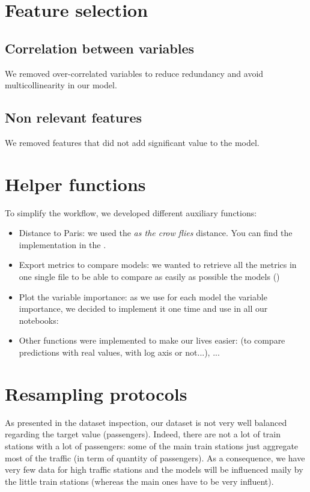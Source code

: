 \section{Feature selection}
\subsection{Correlation between variables}
We removed over-correlated variables to reduce redundancy and avoid multicollinearity in our model.

\subsection{Non relevant features}
We removed features that did not add significant value to the model.

\section{Helper functions}
To simplify the workflow, we developed different auxiliary functions:
\begin{itemize}
    \item Distance to Paris: we used the \textit{as the crow flies} distance. You can find the implementation in the \href{https://github.com/pierre-jezegou/fib-ml-project/blob/main/distance_calculation.py}{}.
    \item Export metrics to compare models: we wanted to retrieve all the metrics in one single file to be able to compare as easily as possible the models ()
    \item Plot the variable importance: as we use for each model the variable importance, we decided to implement it one time and use in all our notebooks: 
    \item Other functions were implemented to make our lives easier:  (to compare predictions with real values, with log axis or not...), ...
\end{itemize}


\section{Resampling protocols}
As presented in the dataset inspection, our dataset is not very well balanced regarding the target value (passengers). Indeed, there are not a lot of train stations with a lot of passengers: some of the main train stations just aggregate most of the traffic (in term of quantity of passengers). As a consequence, we have very few data for high traffic stations and the models will be influenced maily by the little train stations (whereas the main ones have to be very influent).

